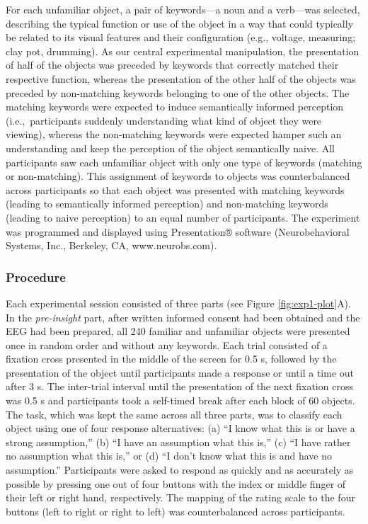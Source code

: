 \documentclass[
  english,
  doc,12pt,twoside,floatsintext]{apa7}
\begin{document}
For each unfamiliar object, a pair of keywords---a noun and a verb---was selected, describing the typical function or use of the object in a way that could typically be related to its visual features and their configuration (e.g., voltage, measuring; clay pot, drumming). As our central experimental manipulation, the presentation of half of the objects was preceded by keywords that correctly matched their respective function, whereas the presentation of the other half of the objects was preceded by non-matching keywords belonging to one of the other objects. The matching keywords were expected to induce semantically informed perception (i.e.,~participants suddenly understanding what kind of object they were viewing), whereas the non-matching keywords were expected hamper such an understanding and keep the perception of the object semantically naive. All participants saw each unfamiliar object with only one type of keywords (matching or non-matching). This assignment of keywords to objects was counterbalanced across participants so that each object was presented with matching keywords (leading to semantically informed perception) and non-matching keywords (leading to naive perception) to an equal number of participants. The experiment was programmed and displayed using Presentation® software (Neurobehavioral Systems, Inc., Berkeley, CA, www.neurobs.com).

\hypertarget{procedure}{%
\subsubsection{Procedure}\label{procedure}}

Each experimental session consisted of three parts (see Figure \ref{fig:exp1-plot}A). In the \emph{pre-insight} part, after written informed consent had been obtained and the EEG had been prepared, all 240 familiar and unfamiliar objects were presented once in random order and without any keywords. Each trial consisted of a fixation cross presented in the middle of the screen for 0.5 s, followed by the presentation of the object until participants made a response or until a time out after 3 s. The inter-trial interval until the presentation of the next fixation cross was 0.5 s and participants took a self-timed break after each block of 60 objects. The task, which was kept the same across all three parts, was to classify each object using one of four response alternatives: (a) ``I know what this is or have a strong assumption,'' (b) ``I have an assumption what this is,'' (c) ``I have rather no assumption what this is,'' or (d) ``I don't know what this is and have no assumption.'' Participants were asked to respond as quickly and as accurately as possible by pressing one out of four buttons with the index or middle finger of their left or right hand, respectively. The mapping of the rating scale to the four buttons (left to right or right to left) was counterbalanced across participants.
\end{document}
